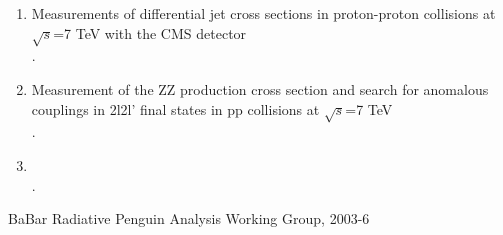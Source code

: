\documentclass [12pt]{report}
\begin{document}
\begin{enumerate}
\item Measurements of differential jet cross sections in proton-proton collisions at $\sqrt{s}$=7 TeV with the CMS detector\\
.

\item Measurement of the ZZ production cross section and search for anomalous couplings in 2l2l' final states in pp collisions at $\sqrt{s}$=7 TeV \\
.

\item \\
.

\end{enumerate}

BaBar Radiative Penguin Analysis Working Group, 2003-6
\end{document}

